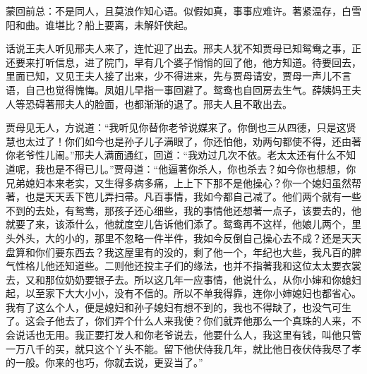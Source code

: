 

\begin{parag}
    \begin{note}蒙回前总：不是同人，且莫浪作知心语。似假如真，事事应难许。著紧温存，白雪阳和曲。谁堪比？船上要离，未解奸侠起。\end{note}
\end{parag}


\begin{parag}
    话说王夫人听见邢夫人来了，连忙迎了出去。邢夫人犹不知贾母已知鸳鸯之事，正还要来打听信息，进了院门，早有几个婆子悄悄的回了他，他方知道。待要回去，里面已知，又见王夫人接了出来，少不得进来，先与贾母请安，贾母一声儿不言语，自己也觉得愧悔。凤姐儿早指一事回避了。鸳鸯也自回房去生气。薛姨妈王夫人等恐碍著邢夫人的脸面，也都渐渐的退了。邢夫人且不敢出去。
\end{parag}


\begin{parag}
    贾母见无人，方说道：“我听见你替你老爷说媒来了。你倒也三从四德，只是这贤慧也太过了！你们如今也是孙子儿子满眼了，你还怕他，劝两句都使不得，还由著你老爷性儿闹。”邢夫人满面通红，回道：“我劝过几次不依。老太太还有什么不知道呢，我也是不得已儿。”贾母道：“他逼著你杀人，你也杀去？如今你也想想，你兄弟媳妇本来老实，又生得多病多痛，上上下下那不是他操心？你一个媳妇虽然帮著，也是天天丢下笆儿弄扫帚。凡百事情，我如今都自己减了。他们两个就有一些不到的去处，有鸳鸯，那孩子还心细些，我的事情他还想著一点子，该要去的，他就要了来，该添什么，他就度空儿告诉他们添了。鸳鸯再不这样，他娘儿两个，里头外头，大的小的，那里不忽略一件半件，我如今反倒自己操心去不成？还是天天盘算和你们要东西去？我这屋里有的没的，剩了他一个，年纪也大些，我凡百的脾气性格儿他还知道些。二则他还投主子们的缘法，也并不指著我和这位太太要衣裳去，又和那位奶奶要银子去。所以这几年一应事情，他说什么，从你小婶和你媳妇起，以至家下大大小小，没有不信的。所以不单我得靠，连你小婶媳妇也都省心。我有了这么个人，便是媳妇和孙子媳妇有想不到的，我也不得缺了，也没气可生了。这会子他去了，你们弄个什么人来我使？你们就弄他那么一个真珠的人来，不会说话也无用。我正要打发人和你老爷说去，他要什么人，我这里有钱，叫他只管一万八千的买，就只这个丫头不能。留下他伏侍我几年，就比他日夜伏侍我尽了孝的一般。你来的也巧，你就去说，更妥当了。”
\end{parag}


